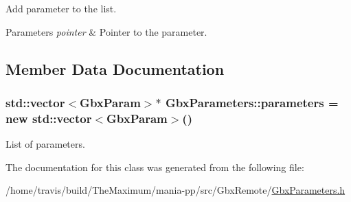 Add parameter to the list. 


\begin{DoxyParams}{Parameters}
{\em pointer} & Pointer to the parameter. \\
\hline
\end{DoxyParams}


\subsection{Member Data Documentation}
\hypertarget{classGbxParameters_af2c27b8d1e5c3884d0e5cc9ba04953cf}{
\subsubsection[{parameters}]{\setlength{\rightskip}{0pt plus 5cm}std\-::vector$<${\bf Gbx\-Param}$>$$\ast$ Gbx\-Parameters\-::parameters = new std\-::vector$<${\bf Gbx\-Param}$>$()\hspace{0.3cm}{\ttfamily [private]}}}\label{classGbxParameters_af2c27b8d1e5c3884d0e5cc9ba04953cf}


List of parameters. 



The documentation for this class was generated from the following file\-:\begin{DoxyCompactItemize}
\item 
/home/travis/build/\-The\-Maximum/mania-\/pp/src/\-Gbx\-Remote/\hyperlink{GbxParameters_8h}{Gbx\-Parameters.\-h}\end{DoxyCompactItemize}
